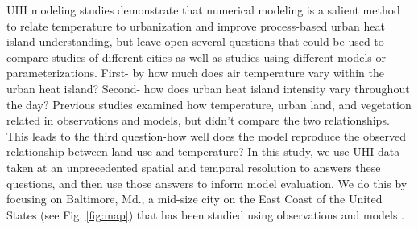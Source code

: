\documentclass[draft,linenumbers]{agujournal}
\begin{document}
UHI modeling studies demonstrate that numerical modeling is a salient method to relate temperature to urbanization and improve process-based urban heat island understanding, but leave open several questions that could be used to compare studies of different cities as well as studies using different models or parameterizations.
 First- by how much does air temperature vary within the urban heat island? Second- how does urban heat island intensity vary throughout the day? Previous studies examined how temperature, urban land, and vegetation related in observations and models, but didn't compare the two relationships. This leads to the third question-how well does the model reproduce the observed relationship between land use and temperature? 
 In this study, %
 we use UHI data taken at an unprecedented spatial and temporal resolution to answers these questions, and then use those answers to inform model evaluation. %
We do this by focusing on Baltimore, Md., a mid-size city on the East Coast of the United States (see Fig. \ref{fig:map}) that has been studied using observations \citep{Huang20111753,scott2017intraurban, scott2018reduced,brazel2000tale} and models \citep{zhang2011impact,li2013development,li2013synergistic,li2015contrasting}.  
\end{document}
